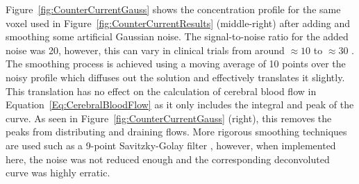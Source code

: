 \documentclass[11pt,english,a4paper,twoside,openright]{report}
\begin{document}
{{{{{{{Figure~\ref{fig:CounterCurrentGauss} shows the concentration profile for the same voxel used in Figure~\ref{fig:CounterCurrentResults} (middle-right) after adding and smoothing some artificial Gaussian noise. The signal-to-noise ratio for the added noise was 20, however, this can vary in clinical trials from around ${\approx}10$ \cite{ostergaard1996high} to ${\approx}30$ \cite{larsson2008dynamic}. The smoothing process is achieved using a moving average of 10 points over the noisy profile which diffuses out the solution and effectively translates it slightly. This translation has no effect on the calculation of cerebral blood flow in Equation~\ref{Eq:CerebralBloodFlow} as it only includes the integral and peak of the curve. As seen in Figure~\ref{fig:CounterCurrentGauss} (right), this removes the peaks from distributing and draining flows. More rigorous smoothing techniques are used such as a 9-point Savitzky-Golay filter \cite{steinier1972smoothing}\cite{wirestam2000assessment}, however, when implemented here, the noise was not reduced enough and the corresponding deconvoluted curve was highly erratic. 

}}}}}}}
\end{document}
